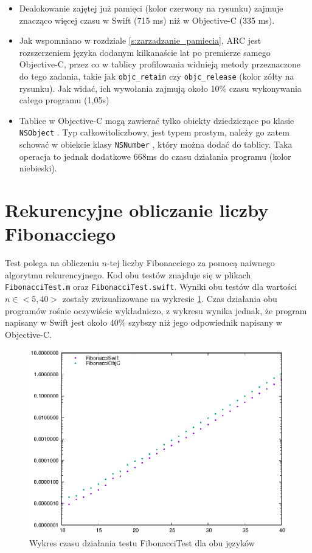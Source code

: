 \documentclass[mgr, shortabstract]{iithesis}
\newcommand{\objcinline}[1]{
    \texttt{#1}
}
\begin{document}
\begin{itemize}
    \item Dealokowanie zajętej już pamięci (kolor czerwony na rysunku) zajmuje znacząco więcej czasu w Swift (715 ms) niż w Objective-C (335 ms).
    \item Jak wspomniano w rozdziale \ref{s:zarzadzanie_pamiecia}, ARC jest rozszerzeniem języka dodanym kilkanaście lat po premierze samego Objective-C, przez co w tablicy profilowania widnieją metody przeznaczone do tego zadania, takie jak \objcinline{objc_retain} czy \objcinline{objc_release} (kolor zółty na rysunku). Jak widać, ich wywołania zajmują około 10\% czasu wykonywania całego programu (1,05s)
    \item Tablice w Objective-C mogą zawierać tylko obiekty dziedziczące po klasie \objcinline{NSObject}. Typ całkowitoliczbowy, jest typem prostym, należy go zatem schować w obiekcie klasy \objcinline{NSNumber}, który można dodać do tablicy. Taka operacja to jednak dodatkowe 668ms do czasu działania programu (kolor niebieski).
\end{itemize}

\section{Rekurencyjne obliczanie liczby Fibonacciego}

Test polega na obliczeniu $n$-tej liczby Fibonacciego za pomocą naiwnego algorytmu rekurencyjnego. Kod obu testów znajduje się w plikach \texttt{FibonacciTest.m} oraz \texttt{FibonacciTest.swift}. Wyniki obu testów dla wartości $n \in <5, 40>$ zostały zwizualizowane na wykresie \ref{p:fibonacci}. Czas działania obu programów rośnie oczywiście wykładniczo, z wykresu wynika jednak, że program napisany w Swift jest około 40\% szybszy niż jego odpowiednik napisany w Objective-C.

\begin{figure}
    \includegraphics{plots/Fibonacci.eps}
    \caption{Wykres czasu działania testu FibonacciTest dla obu języków}
    \label{p:fibonacci}
\end{figure}
\end{document}
